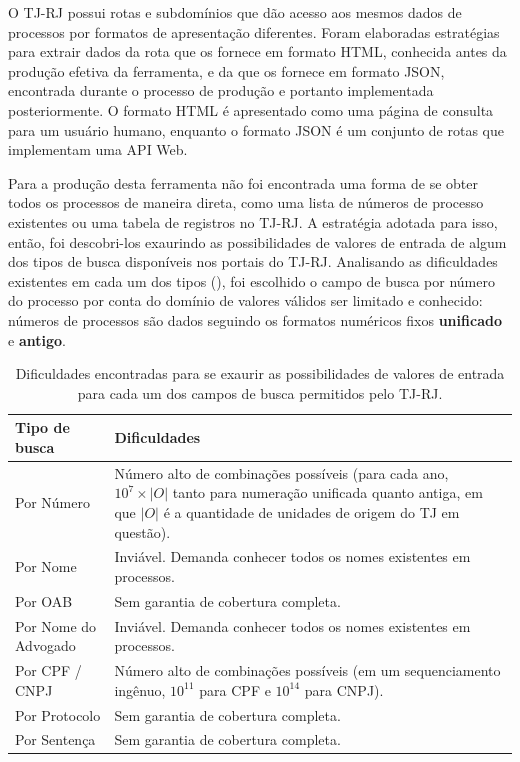 O TJ-RJ possui rotas e subdomínios que dão acesso aos mesmos dados de processos
por formatos de apresentação diferentes. Foram elaboradas estratégias para
extrair dados da rota que os fornece em formato HTML, conhecida antes da
produção efetiva da ferramenta, e da que os fornece em formato JSON, encontrada
durante o processo de produção e portanto implementada posteriormente. O
formato HTML é apresentado como uma página de consulta para um usuário humano,
enquanto o formato JSON é um conjunto de rotas que implementam uma API Web.

Para a produção desta ferramenta não foi encontrada uma forma de se obter todos
os processos de maneira direta, como uma lista de números de processo
existentes ou uma tabela de registros no TJ-RJ. A estratégia adotada para isso,
então, foi descobri-los exaurindo as possibilidades de valores de entrada de
algum dos tipos de busca disponíveis nos portais do TJ-RJ. Analisando as
dificuldades existentes em cada um dos tipos
(), foi escolhido o campo de busca por
número do processo por conta do domínio de valores válidos ser limitado e
conhecido: números de processos são dados seguindo os formatos numéricos fixos
\textbf{unificado} e \textbf{antigo}.

\begin{table}[tb]
    \centering
    \begin{tabular}{lp{}}
        \toprule
        Tipo de busca & Dificuldades \\
        \midrule
        Por Número & Número alto de combinações possíveis (para cada ano,
                     $10^{7} \times |O|$ tanto para numeração unificada quanto
                     antiga, em que $|O|$ é a quantidade de unidades de origem
                     do TJ em questão). \\
        Por Nome & Inviável. Demanda conhecer todos os nomes existentes em processos. \\
        Por OAB & Sem garantia de cobertura completa. \\
        Por Nome do Advogado & Inviável. Demanda conhecer todos os nomes existentes em processos. \\
        Por CPF / CNPJ & Número alto de combinações possíveis (em um sequenciamento ingênuo, $10^{11}$ para CPF e $10^{14}$ para CNPJ). \\
        Por Protocolo & Sem garantia de cobertura completa. \\
        Por Sentença & Sem garantia de cobertura completa. \\
        \bottomrule
    \end{tabular}
    \caption{%
        Dificuldades encontradas para se exaurir as possibilidades de valores
        de entrada para cada um dos campos de busca permitidos pelo TJ-RJ.
    }
    \label{tbl:dificuldades-tipos-de-busca}
\end{table}

